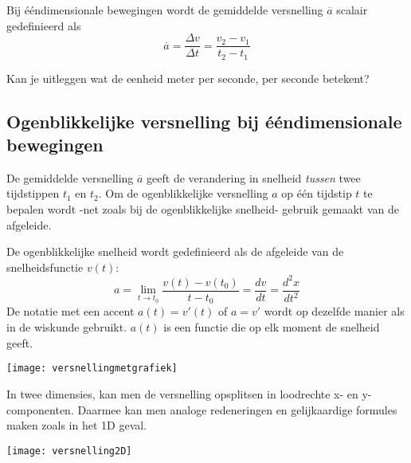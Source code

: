 \documentclass{ximera}
\begin{document}
\begin{definition}

Bij ééndimensionale bewegingen wordt de gemiddelde versnelling \(\overline{a}\) scalair gedefinieerd als
\[
\overline{a}=\frac{\Delta v}{\Delta t}=\frac{v_2-v_1}{t_2-t_1}
\]
\end{definition}

\begin{denkvraag*}{}
Kan je uitleggen wat de eenheid meter per seconde, per seconde betekent? 
\end{denkvraag*}

\subsection*{Ogenblikkelijke versnelling bij ééndimensionale bewegingen}

De gemiddelde versnelling \(\overline{a}\) geeft de verandering in snelheid \textit{tussen} twee tijdstippen \(t_1\) en \(t_2\).  Om de ogenblikkelijke versnelling \(a\) op één tijdstip \(t\) te bepalen wordt -net zoals bij de ogenblikkelijke snelheid- gebruik gemaakt van de afgeleide. 

\begin{definition}
De ogenblikkelijke snelheid wordt gedefinieerd als de afgeleide van de snelheidsfunctie \(v(t)\):
\[
a=\lim_{t\to t_0}\frac{v(t)-v(t_0)}{t-t_0} = \frac{dv}{dt}=\frac{d^2x}{dt^2}
\]
De notatie met een accent $a(t)=v'(t)$ of $a=v'$ wordt op dezelfde manier als in de wiskunde gebruikt. $a(t)$ is een functie die op elk moment de snelheid geeft. 
\end{definition}

\begin{image}
\texttt{[image: versnellingmetgrafiek]}
\end{image}

In twee dimensies, kan men de versnelling opsplitsen in loodrechte x- en y-componenten. Daarmee kan men analoge redeneringen en gelijkaardige formules maken zoals in het 1D geval.

\begin{image}
\texttt{[image: versnelling2D]}

\end{image}
\end{document}
